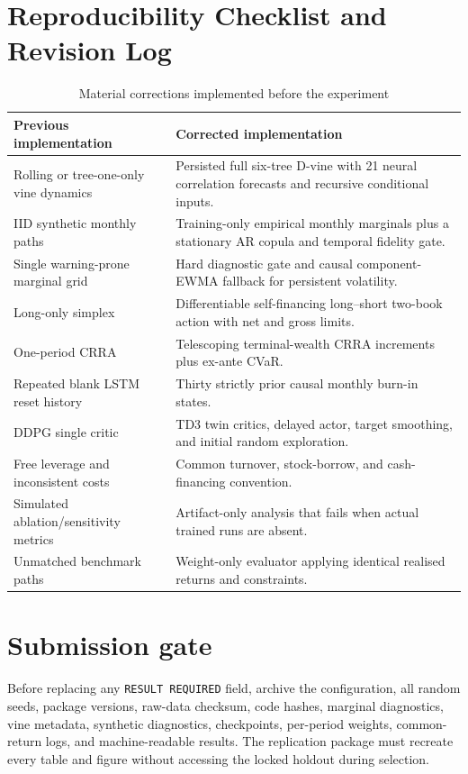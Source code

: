 \appendix
\section{Reproducibility Checklist and Revision Log}
\label{sec:appendix}

\begin{table}[H]
\centering
\caption{Material corrections implemented before the experiment}
\label{tab:corrections}
\begin{tabularx}{\textwidth}{>{\raggedright\arraybackslash}p{}X}
\toprule
Previous implementation & Corrected implementation \\
\midrule
Rolling or tree-one-only vine dynamics & Persisted full six-tree D-vine with 21 neural correlation forecasts and recursive conditional inputs. \\
IID synthetic monthly paths & Training-only empirical monthly marginals plus a stationary AR copula and temporal fidelity gate. \\
Single warning-prone marginal grid & Hard diagnostic gate and causal component-EWMA fallback for persistent volatility. \\
Long-only simplex & Differentiable self-financing long--short two-book action with net and gross limits. \\
One-period CRRA & Telescoping terminal-wealth CRRA increments plus ex-ante CVaR. \\
Repeated blank LSTM reset history & Thirty strictly prior causal monthly burn-in states. \\
DDPG single critic & TD3 twin critics, delayed actor, target smoothing, and initial random exploration. \\
Free leverage and inconsistent costs & Common turnover, stock-borrow, and cash-financing convention. \\
Simulated ablation/sensitivity metrics & Artifact-only analysis that fails when actual trained runs are absent. \\
Unmatched benchmark paths & Weight-only evaluator applying identical realised returns and constraints. \\
\bottomrule
\end{tabularx}
\end{table}

\section{Submission gate}

Before replacing any \texttt{RESULT REQUIRED} field, archive the configuration,
all random seeds, package versions, raw-data checksum, code hashes, marginal
diagnostics, vine metadata, synthetic diagnostics, checkpoints, per-period
weights, common-return logs, and machine-readable results. The replication
package must recreate every table and figure without accessing the locked
holdout during selection.

